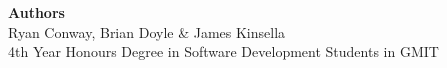 
\vspace{20mm}
\begin{center}
\large\textbf{Authors}
\\
Ryan Conway, Brian Doyle \& James Kinsella
\\
4th Year Honours Degree in Software Development Students in GMIT
\end{center}